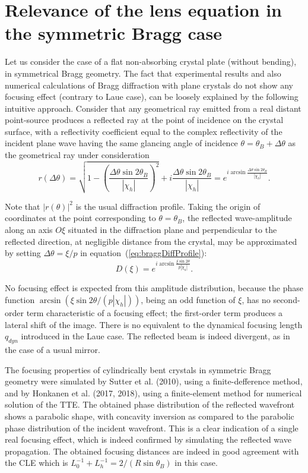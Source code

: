 \documentclass[preprint]{iucr}              %
\begin{document}
\section{Relevance of the lens equation in the symmetric Bragg case}
\label{sec:BraggGeometry}
Let us consider the case of a flat non-absorbing crystal plate (without bending), in symmetrical Bragg geometry. The fact that experimental results and also numerical calculations \cite{Honkanen2018} of Bragg diffraction with plane crystals do not show any focusing effect (contrary to Laue case), can be loosely explained by the following intuitive approach. Consider that any geometrical ray emitted from a real distant point-source produces a reflected ray at the point of incidence on the crystal surface, with a reflectivity coefficient equal to the complex reflectivity of the incident plane wave having the same glancing angle of incidence $\theta=\theta_B+\Delta\theta$ as the geometrical ray under consideration
\begin{equation}
\label{eq:braggDiffProfile}
    r(\Delta\theta) = \sqrt{1-\left(\frac{\Delta\theta\sin2\theta_B}{|\chi_h|}\right)^2} + i \frac{\Delta\theta\sin2\theta_B}{|\chi_h|} =
    e^{i \arcsin{\frac{\Delta\theta \sin2\theta_B}{ |\chi_h|}}}.
\end{equation}

Note that $|r(\theta)|^2$ is the usual diffraction profile. Taking the origin of coordinates at the point corresponding to $\theta=\theta_B$, the reflected wave-amplitude along an axis $O\xi$ situated in the diffraction plane and perpendicular to the reflected direction, at negligible distance from the crystal, may be approximated by setting  $\Delta\theta=\xi/p$ in equation~(\ref{eq:braggDiffProfile}):
\begin{equation}
    D(\xi) = e^{i \arcsin{\frac{\xi \sin2\theta}{p |\chi_h|}}}.
\end{equation}

No focusing effect is expected from this amplitude distribution, because the phase function $\arcsin(\xi \sin2\theta/ (p |\chi_h|))$, being an odd function of $\xi$, has no second-order term characteristic of a focusing effect; the first-order term produces a lateral shift of the image. There is no equivalent to the dynamical focusing length $q_{dyn}$ introduced in the Laue case. The reflected beam is indeed divergent, as in the case of a usual mirror.

The focusing properties of cylindrically bent crystals in symmetric Bragg geometry were simulated by Sutter et al. (2010), using a finite-defference method, and by Honkanen et al. (2017, 2018), using a finite-element method for numerical solution of the TTE. The obtained phase distribution of the reflected wavefront shows a parabolic shape, with concavity inversion as compared to the parabolic phase distribution of the incident wavefront. This is a clear indication of a single real focusing effect, which is indeed confirmed by simulating the reflected wave propagation. The obtained focusing distances are indeed in good agreement with the CLE which is $L_0^{-1}+L_h^{-1}=2/(R \sin\theta_B)$ in this case.
\end{document}
